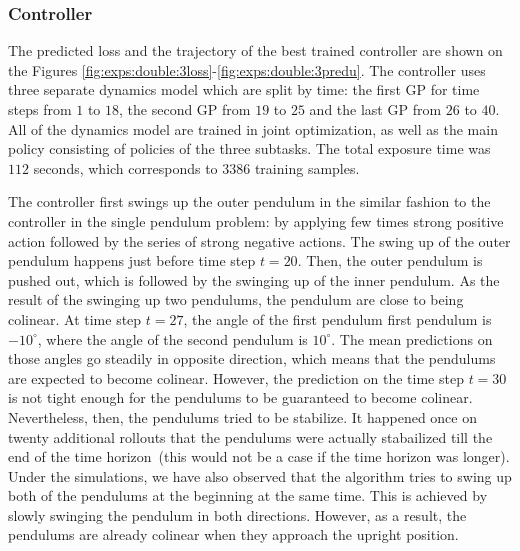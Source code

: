 \subsubsection{Controller}
\label{s:exps:double:ctrl}
The predicted loss and the trajectory of the best trained controller are shown on the Figures \ref{fig:exps:double:3loss}-\ref{fig:exps:double:3predu}. The controller uses three separate dynamics model which are split by time: the first GP for time steps from $1$ to $18$, the second GP from $19$ to $25$ and the last GP from $26$ to $40$. All of the dynamics model are trained in joint optimization, as well as the main policy consisting of policies of the three subtasks.  The total exposure time was $112$ seconds, which corresponds to $3386$ training samples.

\noindent The controller first swings up the outer pendulum in the similar fashion to the controller in the single pendulum problem: by applying few times strong positive action followed by the series of strong negative actions. The swing up of the outer pendulum happens just before time step $t=20$. Then, the outer pendulum is pushed out, which is followed by the swinging up of the inner pendulum. As the result of the swinging up two pendulums, the pendulum are close to being  colinear. At time step $t=27$, the angle of the first pendulum first pendulum is $-10^{\circ}$, where the angle of the second pendulum is $10^{\circ}$. The mean predictions on those angles go steadily in opposite direction, which means that the pendulums are expected to become colinear. However, the prediction on the time step $t=30$ is not tight enough for the pendulums to be guaranteed to become colinear. Nevertheless, then, the pendulums tried to be stabilize. It happened once on twenty additional rollouts that the pendulums were actually stabailized till the end of the time horizon\ (this would not be a case if the time horizon was longer). Under the simulations, we have also observed that the algorithm tries to swing up both of the pendulums at the beginning at the same time. This is achieved by slowly swinging the pendulum in both directions. However, as a result, the pendulums are already colinear when they approach the upright position.

